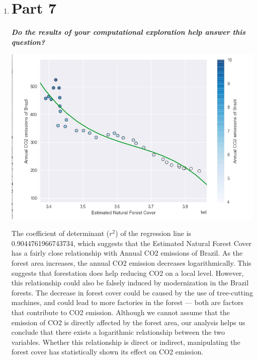\documentclass[12pt]{article}
\begin{document}
\begin{enumerate}
\newpage

\item \section*{Part 7}

\begin{text}


\emph{\textbf{Do the results of your computational exploration help answer this question?}}

\includegraphics[scale=0.5]{./co2-vs-forest.png}

The coefficient of determinant ($r^2$) of the regression line is 0.9044761966743734, which suggests that the Estimated Natural Forest Cover has a fairly close relationship with Annual CO2 emissions of Brazil. As the forest area increases, the annual CO2 emission decreases logarithmically. This suggests that forestation does help reducing CO2 on a local level. However, this relationship could also be falsely induced by modernization in the Brazil forests. The decrease in forest cover could be caused by the use of tree-cutting machines, and could lead to more factories in the forest — both are factors that contribute to CO2 emission. Although we cannot assume that the emission of CO2 is directly affected by the forest area, our analysis helps us conclude that there exists a logarithmic relationship between the two variables. Whether this relationship is direct or indirect, manipulating the forest cover has statistically shown its effect on CO2 emission.


\end{text}
\end{enumerate}
\end{document}
